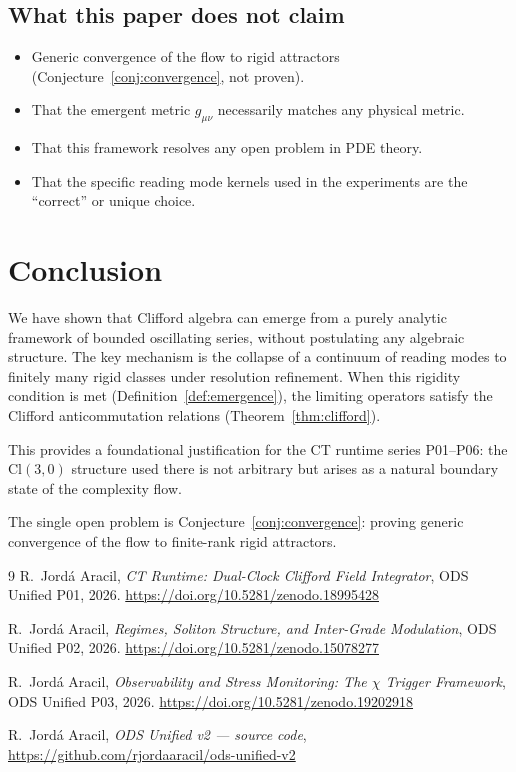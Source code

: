 \documentclass[11pt,a4paper]{article}
\begin{document}
\subsection{What this paper does not claim}
\begin{itemize}
\item Generic convergence of the flow to rigid attractors
      (Conjecture~\ref{conj:convergence}, not proven).
\item That the emergent metric $g_{\mu\nu}$ necessarily matches
      any physical metric.
\item That this framework resolves any open problem in PDE theory.
\item That the specific reading mode kernels used in the experiments
      are the ``correct'' or unique choice.
\end{itemize}

\section{Conclusion}

We have shown that Clifford algebra can emerge from a purely analytic
framework of bounded oscillating series, without postulating any
algebraic structure. The key mechanism is the collapse of a continuum
of reading modes to finitely many rigid classes under resolution
refinement. When this rigidity condition is met (Definition~\ref{def:emergence}),
the limiting operators satisfy the Clifford anticommutation
relations (Theorem~\ref{thm:clifford}).

This provides a foundational justification for the CT runtime
series P01--P06: the $\mathrm{Cl}(3,0)$ structure used there
is not arbitrary but arises as a natural boundary state of the
complexity flow.

The single open problem is Conjecture~\ref{conj:convergence}:
proving generic convergence of the flow to finite-rank rigid
attractors.

\begin{thebibliography}{9}
R.~Jord\'a Aracil,
\emph{CT Runtime: Dual-Clock Clifford Field Integrator},
ODS Unified P01, 2026.
\url{https://doi.org/10.5281/zenodo.18995428}

R.~Jord\'a Aracil,
\emph{Regimes, Soliton Structure, and Inter-Grade Modulation},
ODS Unified P02, 2026.
\url{https://doi.org/10.5281/zenodo.15078277}

R.~Jord\'a Aracil,
\emph{Observability and Stress Monitoring: The $\chi$ Trigger Framework},
ODS Unified P03, 2026.
\url{https://doi.org/10.5281/zenodo.19202918}

R.~Jord\'a Aracil,
\emph{ODS Unified v2 --- source code},
\url{https://github.com/rjordaaracil/ods-unified-v2}
\end{thebibliography}
\end{document}
